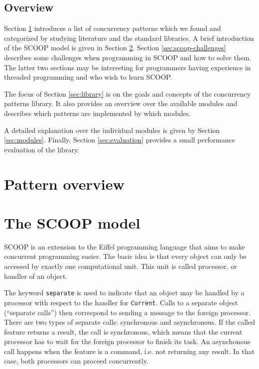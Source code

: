 \documentclass[a4paper,10pt]{article}
\begin{document}
\subsection{Overview}

Section \ref{sec:pattern_overview} introduces a list of concurrency patterns which we found and categorized by studying literature and the standard libraries.
A brief introduction of the SCOOP model is given in Section \ref{sec:scoop-model}.
Section \ref{sec:scoop-challenges} describes some challenges when programming in SCOOP and how to solve them.
The latter two sections may be interesting for programmers having experience in threaded programming and who wish to learn SCOOP.

The focus of Section \ref{sec:library} is on the goals and concepts of the concurrency patterns library.
It also provides an overview over the available modules and describes which patterns are implemented by which modules.

A detailed explanation over the individual modules is given by Section \ref{sec:modules}.
Finally, Section \ref{sec:evaluation} provides a small performance evaluation of the library.

\section {Pattern overview}
\label{sec:pattern_overview}



\section {The SCOOP model}
\label {sec:scoop-model}

SCOOP is an extension to the Eiffel programming language that aims to make concurrent programming easier.
The basic idea is that every object can only be accessed by exactly one computational unit.
This unit is called processor, or handler of an object.

The keyword \lstinline!separate! is used to indicate that an object may be handled by a processor with respect to the handler for \lstinline!Current!.
Calls to a separate object (``separate calls'') then correspond to sending a message to the foreign processor.
There are two types of separate calls: synchronous and asynchronous.
If the called feature returns a result, the call is synchronous, which means that the current processor has to wait for the foreign processor to finish its task.
An asynchonous call happens when the feature is a command, i.e. not returning any result.
In that case, both processors can proceed concurrently.
\end{document}
